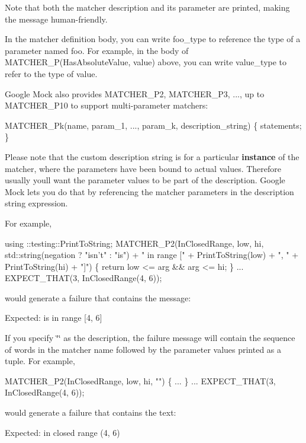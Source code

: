 Note that both the matcher description and its parameter are printed, making the message human-\/friendly.

In the matcher definition body, you can write {\ttfamily foo\+\_\+type} to reference the type of a parameter named {\ttfamily foo}. For example, in the body of {\ttfamily M\+A\+T\+C\+H\+E\+R\+\_\+\+P(\+Has\+Absolute\+Value, value)} above, you can write {\ttfamily value\+\_\+type} to refer to the type of {\ttfamily value}.

Google Mock also provides {\ttfamily M\+A\+T\+C\+H\+E\+R\+\_\+\+P2}, {\ttfamily M\+A\+T\+C\+H\+E\+R\+\_\+\+P3}, ..., up to {\ttfamily M\+A\+T\+C\+H\+E\+R\+\_\+\+P10} to support multi-\/parameter matchers\+: 
\begin{DoxyCode}
MATCHER\_Pk(name, param\_1, ..., param\_k, description\_string) \{ statements; \}
\end{DoxyCode}


Please note that the custom description string is for a particular {\bfseries instance} of the matcher, where the parameters have been bound to actual values. Therefore usually you\textquotesingle{}ll want the parameter values to be part of the description. Google Mock lets you do that by referencing the matcher parameters in the description string expression.

For example, 
\begin{DoxyCode}
using ::testing::PrintToString;
MATCHER\_P2(InClosedRange, low, hi,
           std::string(negation ? \textcolor{stringliteral}{"isn't"} : \textcolor{stringliteral}{"is"}) + \textcolor{stringliteral}{" in range ["} +
           PrintToString(low) + \textcolor{stringliteral}{", "} + PrintToString(hi) + \textcolor{stringliteral}{"]"}) \{
  \textcolor{keywordflow}{return} low <= arg && arg <= hi;
\}
...
EXPECT\_THAT(3, InClosedRange(4, 6));
\end{DoxyCode}
 would generate a failure that contains the message\+: 
\begin{DoxyCode}
Expected: is in range [4, 6]
\end{DoxyCode}


If you specify {\ttfamily \char`\"{}\char`\"{}} as the description, the failure message will contain the sequence of words in the matcher name followed by the parameter values printed as a tuple. For example, 
\begin{DoxyCode}
MATCHER\_P2(InClosedRange, low, hi, \textcolor{stringliteral}{""}) \{ ... \}
...
EXPECT\_THAT(3, InClosedRange(4, 6));
\end{DoxyCode}
 would generate a failure that contains the text\+: 
\begin{DoxyCode}
Expected: in closed range (4, 6)
\end{DoxyCode}


